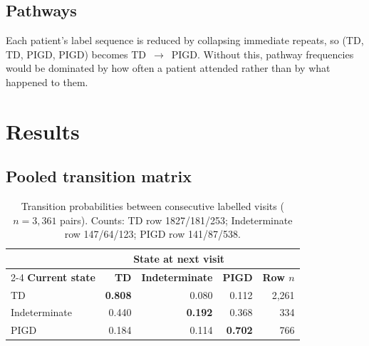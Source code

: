 \documentclass[11pt,a4paper]{article}
\newcommand{\arr}{$\rightarrow$}
\begin{document}
\subsection{Pathways}

Each patient's label sequence is reduced by collapsing immediate repeats, so
(TD, TD, PIGD, PIGD) becomes TD~\arr~PIGD. Without this,
pathway frequencies would be dominated by how often a patient attended rather
than by what happened to them.

\section{Results}

\subsection{Pooled transition matrix}

\begin{table}[htbp]
\centering
\begin{tabular}{@{}l rrr r@{}}
\toprule
 & \multicolumn{3}{c}{\textbf{State at next visit}} & \\
\cmidrule(lr){2-4}
\textbf{Current state} & \textbf{TD} & \textbf{Indeterminate} & \textbf{PIGD} & \textbf{Row $n$} \\
\midrule
TD             & \textbf{0.808} & 0.080 & 0.112 & 2{,}261 \\
Indeterminate  & 0.440 & \textbf{0.192} & 0.368 & 334 \\
PIGD           & 0.184 & 0.114 & \textbf{0.702} & 766 \\
\bottomrule
\end{tabular}
\caption{Transition probabilities between consecutive labelled visits
($n = 3{,}361$ pairs). Counts: TD row 1827/181/253; Indeterminate row
147/64/123; PIGD row 141/87/538.}
\label{tab:matrix}
\end{table}
\end{document}
